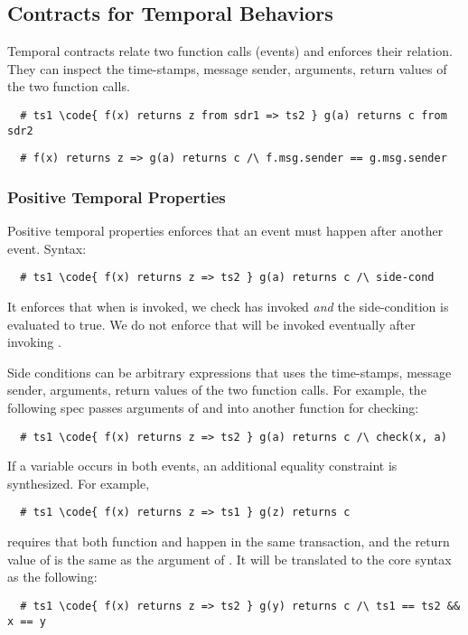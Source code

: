 
\subsection{Contracts for Temporal Behaviors}

Temporal contracts relate two function calls (events) and enforces their
relation.
They can inspect the time-stamps, message sender, arguments, return values
of the two function calls.

\begin{lstlisting}
  # ts1 \code{ f(x) returns z from sdr1 => ts2 } g(a) returns c from sdr2
\end{lstlisting}
\begin{lstlisting}
  # f(x) returns z => g(a) returns c /\ f.msg.sender == g.msg.sender
\end{lstlisting}

\subsubsection{Positive Temporal Properties}

Positive temporal properties enforces that an event must happen
after another event. Syntax:
\begin{lstlisting}
  # ts1 \code{ f(x) returns z => ts2 } g(a) returns c /\ side-cond
\end{lstlisting}
It enforces that when  is invoked, we check  has invoked \emph{and}
the side-condition is evaluated to true.
We do not enforce that  will be invoked eventually after invoking .

Side conditions can be arbitrary expressions that uses the time-stamps, message
sender, arguments, return values of the two function calls.
For example, the following spec passes arguments of  and  into
another function for checking:

\begin{lstlisting}
  # ts1 \code{ f(x) returns z => ts2 } g(a) returns c /\ check(x, a)
\end{lstlisting}

If a variable occurs in both events, an additional equality constraint
is synthesized.  For example,
\begin{lstlisting}
  # ts1 \code{ f(x) returns z => ts1 } g(z) returns c
\end{lstlisting}
requires that both function  and  happen in the same transaction,
and the return value of  is the same as the argument of .
It will be translated to the core syntax as the following:
\begin{lstlisting}
  # ts1 \code{ f(x) returns z => ts2 } g(y) returns c /\ ts1 == ts2 && x == y
\end{lstlisting}

